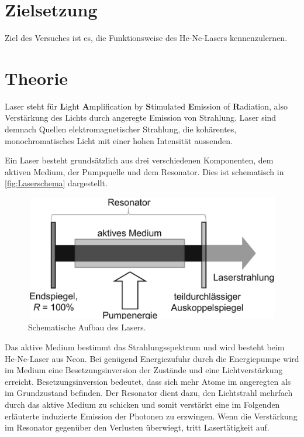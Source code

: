 \section{Zielsetzung}
\label{sec:Zielsetzung}
Ziel des Versuches ist es, die Funktionsweise des He-Ne-Lasers kennenzulernen.

\section{Theorie}
\label{sec:Theorie}

Laser steht für \textbf{L}ight \textbf{A}mplification by \textbf{S}timulated \textbf{E}mission of \textbf{R}adiation, also
Verstärkung des Lichts durch angeregte Emission von Strahlung.
Laser sind demnach Quellen elektromagnetischer Strahlung, die kohärentes, monochromatisches Licht mit einer hohen Intensität aussenden.


Ein Laser besteht grundsätzlich aus drei verschiedenen Komponenten, dem aktiven Medium, der Pumpquelle und dem Resonator.
Dies ist schematisch in \autoref{fig:Laserschema} dargestellt.\\

\begin{figure}[H]
    \centering
    \includegraphics[scale=0.7]{Abbildungen/schemalaser.png}
    \caption{Schematische Aufbau des Lasers.\cite{Gerhard2020}}
    \label{fig:Laserschema}
\end{figure}

Das aktive Medium bestimmt das Strahlungsspektrum und wird besteht beim He-Ne-Laser aus Neon.
Bei genügend Energiezufuhr durch die Energiepumpe wird im Medium eine Besetzungsinversion der Zustände und eine Lichtverstärkung erreicht.
Besetzungsinversion bedeutet, dass sich mehr Atome im angeregten als im Grundzustand befinden.
Der Resonator dient dazu, den Lichtstrahl mehrfach durch das aktive Medium zu schicken und somit verstärkt eine im Folgenden erläuterte
induzierte Emission der Photonen zu erzwingen.
Wenn die Verstärkung im Resonator gegenüber den Verlusten überwiegt, tritt Lasertätigkeit auf.\\

